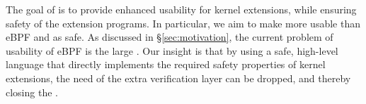 
%


The goal of \projname{} is to provide enhanced usability for kernel extensions,
    while ensuring safety of the extension programs.
In particular, we aim to make \projname{} more usable than eBPF and as safe.
As discussed in \S\ref{sec:motivation}, the current problem of usability of
    eBPF is the large \gap{}. %
Our insight is that by using a safe, high-level language that directly
    implements the required safety properties of kernel extensions, the need
    of the extra verification layer can be dropped, and thereby closing the
    \gap{}.


